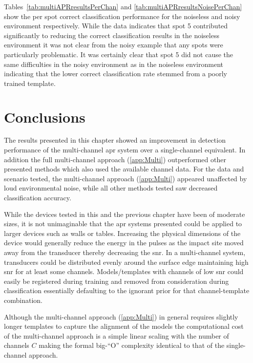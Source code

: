 Tables~\ref{tab:multiAPRresultsPerChan} and \ref{tab:multiAPRresultsNoisePerChan} show the per spot correct classification performance for the noiseless and noisy environment respectively. While the data indicates that spot 5 contributed significantly to reducing the correct classification results in the noiseless environment it was not clear from the noisy example that any spots were particularly problematic. It was certainly clear that spot 5 did not cause the same difficulties in the noisy environment as in the noiseless environment indicating that the lower correct classification rate stemmed from a poorly trained template. 



\section{Conclusions}
The results presented in this chapter showed an improvement in detection performance of the multi-channel \gls{apr} system over a single-channel equivalent. In addition the full multi-channel approach (\ref{app:Multi}) outperformed other presented methods which also used the available channel data. For the data and scenario tested, the multi-channel approach (\ref{app:Multi}) appeared unaffected by loud environmental noise, while all other methods tested saw decreased classification accuracy.

While the devices tested in this and the previous chapter have been of moderate sizes, it is not unimaginable that the \gls{apr} systems presented could be applied to larger devices such as walls or tables. Increasing the physical dimensions of the device would generally reduce the energy in the pulses as the impact site moved away from the transducer thereby decreasing the \gls{snr}. In a multi-channel system, transducers could be distributed evenly around the surface edge maintaining high \gls{snr} for at least some channels. Models/templates with channels of low \gls{snr} could easily be registered during training and removed from consideration during classification essentially defaulting to the ignorant prior for that channel-template combination.

Although the multi-channel approach (\ref{app:Multi}) in general requires slightly longer templates to capture the alignment of the models the computational cost of the multi-channel approach is a simple linear scaling with the number of channels $C$ making the formal big-``O'' complexity identical to that of the single-channel approach.

